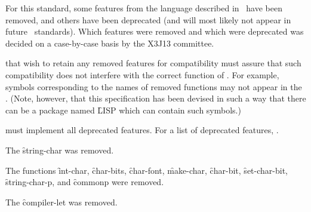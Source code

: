 

For this standard,
    some features from the language described in \CLtL\ have been removed,
and others have been deprecated (and will most likely not appear
in future \clisp\ standards).
Which features were removed and which were deprecated
was decided on a case-by-case basis by the X3J13 committee.
 
 that wish to retain any removed 
features for compatibility must assure that such compatibility 
does not interfere with the correct function of .
For example, symbols corresponding to the names of removed functions
may not appear in the .
(Note, however, that this specification has been devised in such a way 
that there can be a package named \f{LISP} which can contain such symbols.)

 must implement all deprecated features.
For a list of deprecated features, \seesection\DeprecatedFeatures.

\endsubSection%


The  \f{string-char} was removed.

\endsubsection%


The functions
\f{int-char},
\f{char-bits},
\f{char-font},
\f{make-char},
\f{char-bit},
\f{set-char-bit},
\f{string-char-p},
%
and
\f{commonp}
%
%
were removed.

The  \f{compiler-let} was removed.

